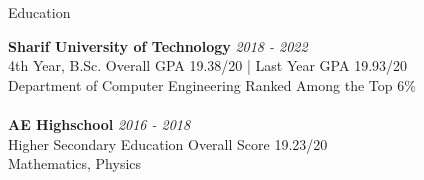 \documentclass{resume} %
\begin{document}
\begin{rSection}{Education}

{\bf Sharif University of Technology} \hfill \textcolor{Black!70}{\em 2018 - 2022} 
\\ 4th Year, B.Sc. \hfill \textcolor{Black!70}{ Overall GPA 19.38/20 | Last Year GPA 19.93/20}
\\ Department of Computer Engineering \hfill \textcolor{Black!70}{Ranked Among the Top 6\%}
\\
\\{\bf AE Highschool} \hfill \textcolor{Black!70}{\em 2016 - 2018} 
\\ Higher Secondary Education \hfill \textcolor{Black!70}{ Overall Score 19.23/20}
\\ Mathematics, Physics
\\



\end{rSection}
\end{document}
